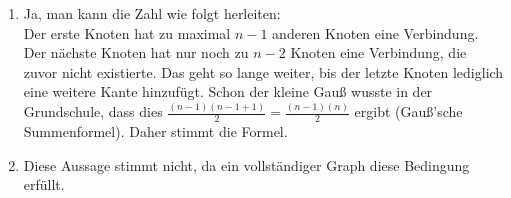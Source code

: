 \documentclass{article}
\begin{document}
\begin{enumerate}[label=(\alph*)]
\item Ja, man kann die Zahl wie folgt herleiten:\\
Der erste Knoten hat zu maximal \(n-1\) anderen Knoten eine Verbindung. Der
nächste Knoten hat nur noch zu \(n-2\) Knoten eine Verbindung, die zuvor nicht
existierte. Das geht so lange weiter, bis der letzte Knoten lediglich eine
weitere Kante hinzufügt. Schon der kleine Gauß wusste in der Grundschule, dass
dies \(\frac{(n-1)(n-1+1)}{2} = \frac{(n-1)(n)}{2}\) ergibt (Gauß'sche
Summenformel). Daher stimmt die Formel.

\item Diese Aussage stimmt nicht, da ein vollständiger Graph diese Bedingung
erfüllt.


\end{enumerate}
\end{document}

